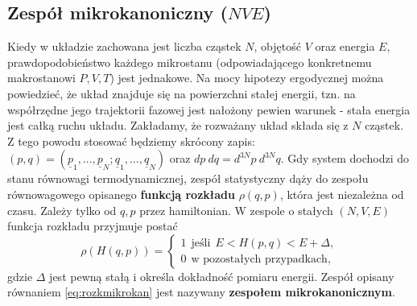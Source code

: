 \documentclass[12pt,a4paper,openright]{report} %
\begin{document}
\subsection{Zespół mikrokanoniczny ($N V E$)}
Kiedy w układzie zachowana jest liczba cząstek $N$, objętość $V$ oraz energia $E$, prawdopodobieństwo każdego mikrostanu (odpowiadającego konkretnemu makrostanowi $P, V, T$) jest jednakowe. Na mocy hipotezy ergodycznej można powiedzieć, że układ znajduje się na powierzchni stałej energii, tzn. na współrzędne jego trajektorii fazowej jest nałożony pewien warunek - stała energia jest całką ruchu układu. Zakładamy, że rozważany układ składa się z $N$ cząstek. Z tego powodu stosować będziemy skrócony zapis: $(p,q)=(\underline{p}_1, ..., \underline{p}_N; \underline{q}_1,..., \underline{q}_N)$ oraz $dp~dq = d^{3N}p~d^{3N}q$.
Gdy system dochodzi do stanu równowagi termodynamicznej, zespół statystyczny dąży do zespołu równowagowego opisanego \textbf{funkcją rozkładu} $\rho({q},{p})$, która jest niezależna od czasu. Zależy tylko od ${q},{p}$ przez hamiltonian. W zespole o stałych $(N, V, E)$ funkcja rozkładu przyjmuje postać
\begin{equation}
\rho(H({q},{p}))=
\begin{cases}
1 ~~ \text{jeśli} ~~ E<H(p,q)<E+\Delta,\\
0 ~~ \text{w pozostałych przypadkach},
\end{cases}
\label{eq:rozkmikrokan}
\end{equation}
gdzie $\Delta$ jest pewną stałą i określa dokładność pomiaru energii. Zespół opisany równaniem \ref{eq:rozkmikrokan} jest nazywany \textbf{zespołem mikrokanonicznym}.
%
\end{document}
